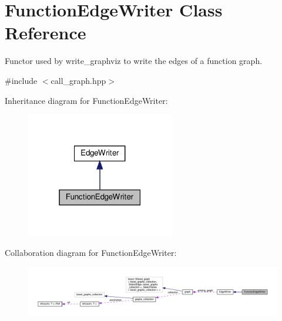 \hypertarget{classFunctionEdgeWriter}{}\section{Function\+Edge\+Writer Class Reference}
\label{classFunctionEdgeWriter}


Functor used by write\+\_\+graphviz to write the edges of a function graph.  




{\ttfamily \#include $<$call\+\_\+graph.\+hpp$>$}



Inheritance diagram for Function\+Edge\+Writer\+:
\nopagebreak
\begin{figure}[H]
\begin{center}
\leavevmode
\includegraphics[width=183pt]{d1/d78/classFunctionEdgeWriter__inherit__graph}
\end{center}
\end{figure}


Collaboration diagram for Function\+Edge\+Writer\+:
\nopagebreak
\begin{figure}[H]
\begin{center}
\leavevmode
\includegraphics[width=350pt]{d9/d98/classFunctionEdgeWriter__coll__graph}
\end{center}
\end{figure}
